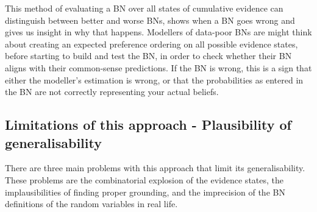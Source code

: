 \documentclass[11pt]{article}
\begin{document}
This method of evaluating a BN over all states of cumulative evidence can distinguish between better and worse BNs, shows when a BN goes wrong and gives us insight in why that happens. Modellers of data-poor BNs are might think about creating an expected preference ordering on all possible evidence states, before starting to build and test the BN, in order to check whether their BN aligns with their common-sense predictions. If the BN is wrong, this is a sign that either the modeller's estimation is wrong, or that the probabilities as entered in the BN are not correctly representing your actual beliefs.


\subsection{Limitations of this approach - Plausibility of generalisability}

There are three main problems with this approach that limit its generalisability. These problems are the combinatorial explosion of the evidence states, the implausibilities of finding proper grounding, and the imprecision of the BN definitions of the random variables in real life.
\end{document}
